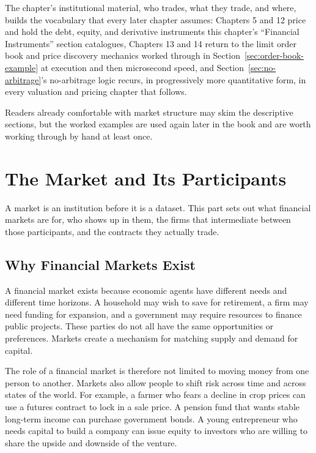 \documentclass[../ai_in_finance]{subfiles}
\begin{document}
The chapter's institutional material, who trades, what they trade, and where, builds the vocabulary that every later chapter assumes: Chapters 5 and 12 price and hold the debt, equity, and derivative instruments this chapter's ``Financial Instruments'' section catalogues, Chapters 13 and 14 return to the limit order book and price discovery mechanics worked through in Section~\ref{sec:order-book-example} at execution and then microsecond speed, and Section~\ref{sec:no-arbitrage}'s no-arbitrage logic recurs, in progressively more quantitative form, in every valuation and pricing chapter that follows.

Readers already comfortable with market structure may skim the descriptive sections, but the worked examples are used again later in the book and are worth working through by hand at least once.

\section{The Market and Its Participants}

A market is an institution before it is a dataset. This part sets out what financial markets are for, who shows up in them, the firms that intermediate between those participants, and the contracts they actually trade.

\subsection{Why Financial Markets Exist}

A financial market exists because economic agents have different needs and different time horizons. A household may wish to save for retirement, a firm may need funding for expansion, and a government may require resources to finance public projects. These parties do not all have the same opportunities or preferences. Markets create a mechanism for matching supply and demand for capital.

The role of a financial market is therefore not limited to moving money from one person to another. Markets also allow people to shift risk across time and across states of the world. For example, a farmer who fears a decline in crop prices can use a futures contract to lock in a sale price. A pension fund that wants stable long-term income can purchase government bonds. A young entrepreneur who needs capital to build a company can issue equity to investors who are willing to share the upside and downside of the venture.
\end{document}
